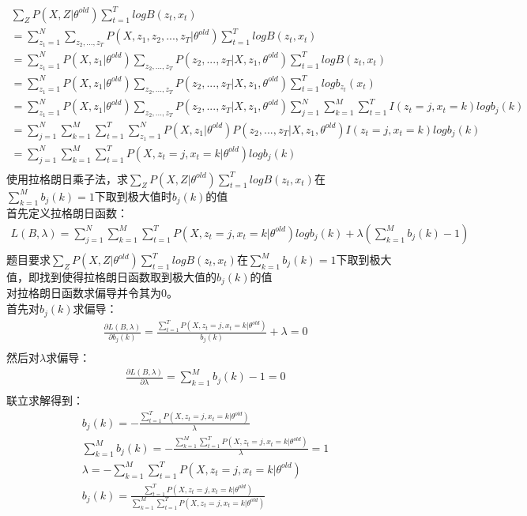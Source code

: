 \documentclass[12pt,a4paper]{article}
\begin{document}
\begin{gather*}
    \sum_{Z}P(X,Z|\theta^{old})\sum_{t=1}^{T}logB(z_t,x_t)\\
    = \sum_{z_1=1}^{N}\sum_{z_2,...,z_T}P(X,z_1,z_2,...,z_T|\theta^{old})\sum_{t=1}^{T}logB(z_t,x_t)\\
    =\sum_{z_1=1}^{N}P(X,z_1|\theta^{old})\sum_{z_2,...,z_T}P(z_2,...,z_T|X,z_1,\theta^{old})\sum_{t=1}^{T}logB(z_t,x_t)\\
    = \sum_{z_1=1}^{N}P(X,z_1|\theta^{old})\sum_{z_2,...,z_T}P(z_2,...,z_T|X,z_1,\theta^{old})\sum_{t=1}^{T}logb_{z_t}(x_t)\\
    = \sum_{z_1=1}^{N}P(X,z_1|\theta^{old})\sum_{z_2,...,z_T}P(z_2,...,z_T|X,z_1,\theta^{old})\sum_{j=1}^{N}\sum_{k=1}^{M}\sum_{t=1}^{T}I(z_t = j,x_t = k)logb_{j}(k)\\
    = \sum_{j=1}^{N}\sum_{k=1}^{M}\sum_{t=1}^{T}\sum_{z_1=1}^{N}P(X,z_1|\theta^{old})P(z_2,...,z_T|X,z_1,\theta^{old})I(z_t = j,x_t = k)logb_{j}(k)\\
    = \sum_{j=1}^{N}\sum_{k=1}^{M}\sum_{t=1}^{T}P(X,z_t = j,x_t = k|\theta^{old})logb_{j}(k)\\
\end{gather*}
使用拉格朗日乘子法，求$\sum_{Z}P(X,Z|\theta^{old})\sum_{t=1}^{T}logB(z_t,x_t)$在$\sum_{k=1}^{M}b_{j}(k) = 1$下取到极大值时$b_{j}(k)$的值\\
首先定义拉格朗日函数：
\begin{gather*}
    L(B,\lambda) = \sum_{j=1}^{N}\sum_{k=1}^{M}\sum_{t=1}^{T}P(X,z_t = j,x_t = k|\theta^{old})logb_{j}(k) + \lambda(\sum_{k=1}^{M}b_{j}(k) - 1)\\
\end{gather*}
题目要求$\sum_{Z}P(X,Z|\theta^{old})\sum_{t=1}^{T}logB(z_t,x_t)$在$\sum_{k=1}^{M}b_{j}(k) = 1$下取到极大值，即找到使得拉格朗日函数取到极大值的$b_{j}(k)$的值\\
对拉格朗日函数求偏导并令其为0。\\
首先对$b_{j}(k)$求偏导：
\begin{gather*}
    \frac{\partial L(B,\lambda)}{\partial b_{j}(k)} = \frac{\sum_{t=1}^{T}P(X,z_t = j,x_t = k|\theta^{old})}{b_{j}(k)} + \lambda = 0\\
\end{gather*}
然后对$\lambda$求偏导：
\begin{gather*}
    \frac{\partial L(B,\lambda)}{\partial \lambda} = \sum_{k=1}^{M}b_{j}(k) - 1 = 0\\
\end{gather*}
联立求解得到：
\begin{gather*}
    b_{j}(k) = -\frac{\sum_{t=1}^{T}P(X,z_t = j,x_t = k|\theta^{old})}{\lambda}\\
    \sum_{k=1}^{M}b_{j}(k) = -\frac{\sum_{k=1}^{M}\sum_{t=1}^{T}P(X,z_t = j,x_t = k|\theta^{old})}{\lambda} = 1\\
    \lambda = -\sum_{k=1}^{M}\sum_{t=1}^{T}P(X,z_t = j,x_t = k|\theta^{old})\\
    b_{j}(k) = \frac{\sum_{t=1}^{T}P(X,z_t = j,x_t = k|\theta^{old})}{\sum_{k=1}^{M}\sum_{t=1}^{T}P(X,z_t = j,x_t = k|\theta^{old})}\\
\end{gather*}
\end{document}
